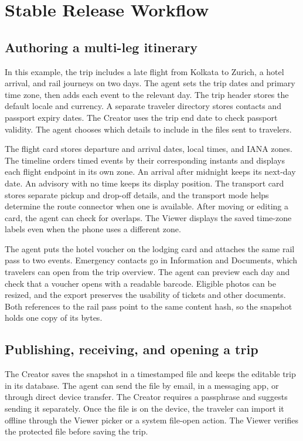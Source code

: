 \section{Stable Release Workflow}
\label{sec:stable-workflow}

\subsection{Authoring a multi-leg itinerary}
In this example, the trip includes a late flight from Kolkata to Zurich, a hotel arrival, and rail journeys on two days. The agent sets the trip dates and primary time zone, then adds each event to the relevant day. The trip header stores the default locale and currency. A separate traveler directory stores contacts and passport expiry dates. The Creator uses the trip end date to check passport validity. The agent chooses which details to include in the files sent to travelers.

The flight card stores departure and arrival dates, local times, and IANA zones. The timeline orders timed events by their corresponding instants and displays each flight endpoint in its own zone. An arrival after midnight keeps its next-day date. An advisory with no time keeps its display position. The transport card stores separate pickup and drop-off details, and the transport mode helps determine the route connector when one is available. After moving or editing a card, the agent can check for overlaps. The Viewer displays the saved time-zone labels even when the phone uses a different zone.

The agent puts the hotel voucher on the lodging card and attaches the same rail pass to two events. Emergency contacts go in Information and Documents, which travelers can open from the trip overview. The agent can preview each day and check that a voucher opens with a readable barcode. Eligible photos can be resized, and the export preserves the usability of tickets and other documents. Both references to the rail pass point to the same content hash, so the snapshot holds one copy of its bytes.

\subsection{Publishing, receiving, and opening a trip}
The Creator saves the snapshot in a timestamped file and keeps the editable trip in its database. The agent can send the file by email, in a messaging app, or through direct device transfer. The Creator requires a passphrase and suggests sending it separately. Once the file is on the device, the traveler can import it offline through the Viewer picker or a system file-open action. The Viewer verifies the protected file before saving the trip.

